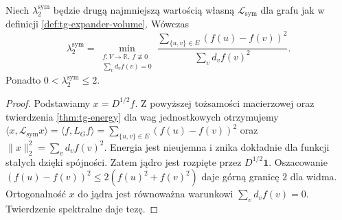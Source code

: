 \begin{lemat}
\label{lem:tg-expander-weighted-rayleigh}
Niech $\lambda_2^{\mathrm{sym}}$ będzie drugą najmniejszą
wartością własną $\mathcal L_{\mathrm{sym}}$ dla grafu
jak w definicji \ref{def:tg-expander-volume}. Wówczas
\[
\lambda_2^{\mathrm{sym}}=
\min_{\substack{f:V\to\mathbb R,\ f\not\equiv0\\\sum_v d_v f(v)=0}}
\frac{\sum_{\{u,v\}\in E}(f(u)-f(v))^2}
{\sum_v d_v f(v)^2}.
\]
Ponadto $0<\lambda_2^{\mathrm{sym}}\leq2$.
\end{lemat}
\begin{proof}
Podstawiamy $x=D^{1/2}f$. Z powyższej tożsamości macierzowej
oraz twierdzenia \ref{thm:tg-energy} dla wag jednostkowych
otrzymujemy $\langle x,\mathcal L_{\mathrm{sym}}x\rangle
=\langle f,L_Gf\rangle
=\sum_{\{u,v\}\in E}(f(u)-f(v))^2$ oraz
$\|x\|_2^2=\sum_v d_v f(v)^2$.
Energia jest nieujemna i znika dokładnie dla funkcji
stałych dzięki spójności. Zatem jądro jest rozpięte
przez $D^{1/2}\boldsymbol1$.
Oszacowanie $(f(u)-f(v))^2\leq2(f(u)^2+f(v)^2)$
daje górną granicę $2$ dla widma.
Ortogonalność $x$ do jądra jest równoważna
warunkowi $\sum_vd_vf(v)=0$.
Twierdzenie spektralne daje tezę.
\end{proof}

